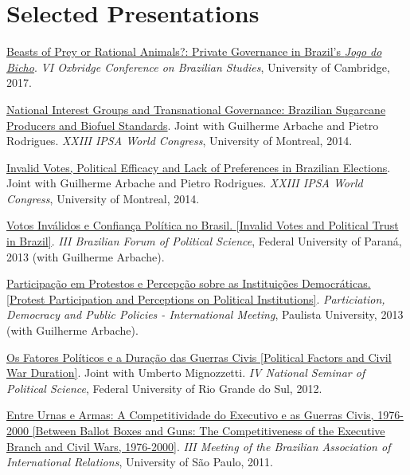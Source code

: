 \documentclass[letterpaper]{article}
\renewenvironment{itemize}{
  \begin{list}{}{
    \setlength{\leftmargin}{1.5em}
  }
}{
  \end{list}
}
\begin{document}
\section*{Selected Presentations}

\begin{itemize}
	\item \href{https://osf.io/se2jr}{Beasts of Prey or Rational Animals?: Private Governance in Brazil's \emph{Jogo do Bicho}}. \textit{VI Oxbridge Conference on Brazilian Studies}, University of Cambridge, 2017.
	\item \href{http://paperroom.ipsa.org/papers/paper_37733.pdf}{National Interest Groups and Transnational Governance: Brazilian Sugarcane Producers and Biofuel Standards}. Joint with Guilherme Arbache and Pietro Rodrigues. \textit{XXIII IPSA World Congress}, University of Montreal, 2014.
	\item \href{http://paperroom.ipsa.org/papers/paper_36099.pdf}{Invalid Votes, Political Efficacy and Lack of Preferences in Brazilian Elections}. Joint with Guilherme Arbache and Pietro Rodrigues. \textit{XXIII IPSA World Congress}, University of Montreal, 2014.
	\item \href{http://www.forumcienciapolitica.com.br/anais/2013/especific_files/papers/6NFN.pdf?v=0310}{Votos Inv\'{a}lidos e Confian\c{c}a Pol\'{i}tica no Brasil. {[}Invalid Votes and Political Trust in Brazil{]}}. \textit{III Brazilian Forum of Political Science}, Federal University of Paran\'{a}, 2013 (with Guilherme Arbache).
	\item \href{http://www.encontropdpp.sinteseeventos.com.br/ST15.zip}{Participa\c{c}\~{a}o em Protestos e Percep\c{c}\~{a}o sobre as Institui\c{c}\~{o}es Democr\'{a}ticas. {[}Protest Participation and Perceptions on Political Institutions{]}}.\textit{ Particiation, Democracy and Public Policies - International Meeting}, Paulista University, 2013 (with Guilherme Arbache).
	\item \href{http://www.ufrgs.br/sncp/edicoes-anteriores/2012/politica-internacional}{Os Fatores Pol\'{i}ticos e a Dura\c{c}\~{a}o das Guerras Civis {[}Political Factors and Civil War Duration{]}}. Joint with Umberto Mignozzetti. \textit{IV National Seminar of Political Science}, Federal University of Rio Grande do Sul, 2012.
	\item \href{http://ena2011.abri.org.br/index.php?p=programacao\&n=10}{Entre Urnas e Armas: A Competitividade do Executivo e as Guerras Civis, 1976-2000 {[}Between Ballot Boxes and Guns: The Competitiveness of the Executive Branch and Civil Wars, 1976-2000{]}}. \textit{III Meeting of the Brazilian Association of International Relations}, University of S\~{a}o Paulo, 2011.
\end{itemize}
\end{document}
